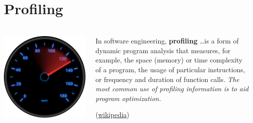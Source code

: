 \documentclass[9pt,xcolor=table]{beamer}
\begin{document}
\section{Profiling}
\begin{frame}
\frametitle{\insertsectionhead{}}
\begin{columns}[c]
  \begin{column}{.4\textwidth}
    \begin{center}
      \includegraphics[width=.8\textwidth]{img/kmh_speedometer}
    \end{center}
    \end{column}
    \begin{column}{.55\textwidth}
      In software engineering, \textbf{profiling} \dots is a form of dynamic program analysis that \alert{measures}, for example, the space (memory) or time complexity of a program, the usage of particular instructions, or frequency and duration of function calls. \textit{The most common use of profiling information is to aid program optimization.}
      \begin{flushright}
        \small(\href{http://en.wikipedia.org/wiki/Profiling_(computer_programming)}{wikipedia})
      \end{flushright}
    \end{column}
  \end{columns}
\end{frame}
\end{document}
